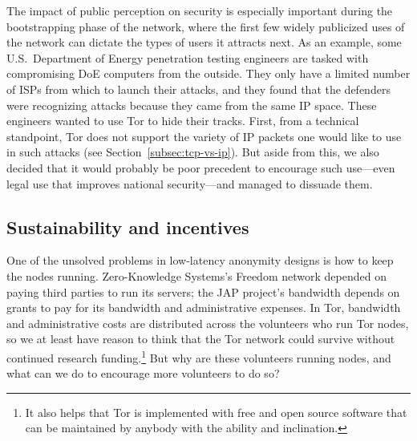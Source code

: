 \documentclass{llncs}
\begin{document}
The impact of public perception on security is especially important
during the bootstrapping phase of the network, where the first few
widely publicized uses of the network can dictate the types of users it
attracts next.
As an example, some U.S.~Department of Energy
penetration testing engineers are tasked with compromising DoE computers
from the outside. They only have a limited number of ISPs from which to
launch their attacks, and they found that the defenders were recognizing
attacks because they came from the same IP space. These engineers wanted
to use Tor to hide their tracks. First, from a technical standpoint,
Tor does not support the variety of IP packets one would like to use in
such attacks (see Section~\ref{subsec:tcp-vs-ip}). But aside from this,
we also decided that it would probably be poor precedent to encourage
such use---even legal use that improves national security---and managed
to dissuade them.


\subsection{Sustainability and incentives}
One of the unsolved problems in low-latency anonymity designs is
how to keep the nodes running.  Zero-Knowledge Systems's Freedom network
depended on paying third parties to run its servers; the JAP project's
bandwidth depends on grants to pay for its bandwidth and
administrative expenses.  In Tor, bandwidth and administrative costs are
distributed across the volunteers who run Tor nodes, so we at least have
reason to think that the Tor network could survive without continued research
funding.\footnote{It also helps that Tor is implemented with free and open
  source software that can be maintained by anybody with the ability and
  inclination.}  But why are these volunteers running nodes, and what can we
do to encourage more volunteers to do so?
\end{document}
